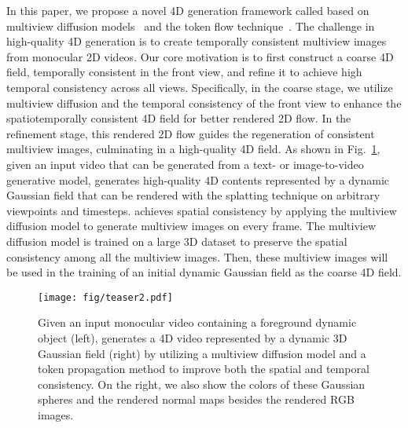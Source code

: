 In this paper, we propose a novel 4D generation framework called \methodname based on multiview diffusion models~\citep{li2024era3d} and the token flow technique~\citep{geyer2023tokenflow}. 
The challenge in high-quality 4D generation is to create temporally consistent multiview images from monocular 2D videos. Our core motivation is to first construct a coarse 4D field, temporally consistent in the front view, and refine it to achieve high temporal consistency across all views. Specifically, in the coarse stage, we utilize multiview diffusion and the temporal consistency of the front view to enhance the spatiotemporally consistent 4D field for better rendered 2D flow. In the refinement stage, this rendered 2D flow guides the regeneration of consistent multiview images, culminating in a high-quality 4D field.
As shown in Fig.~\ref{fig:teaser}, given an input video that can be generated from a text- or image-to-video generative model, \methodname generates high-quality 4D contents represented by a dynamic Gaussian field that can be rendered with the splatting technique on arbitrary viewpoints and timesteps. \methodname achieves spatial consistency by applying the multiview diffusion model to generate multiview images on every frame. The multiview diffusion model is trained on a large 3D dataset to preserve the spatial consistency among all the multiview images. Then, these multiview images will be used in the training of an initial dynamic Gaussian field as the coarse 4D field.

\begin{figure}
    \centering
    \texttt{[image: fig/teaser2.pdf]}
    \caption{Given an input monocular video containing a foreground dynamic object (left), \methodname generates a 4D video represented by a dynamic 3D Gaussian field (right) by utilizing a multiview diffusion model and a token propagation method to improve both the spatial and temporal consistency. On the right, we also show the colors of these Gaussian spheres and the rendered normal maps besides the rendered RGB images.}
    \label{fig:teaser}
\end{figure}

